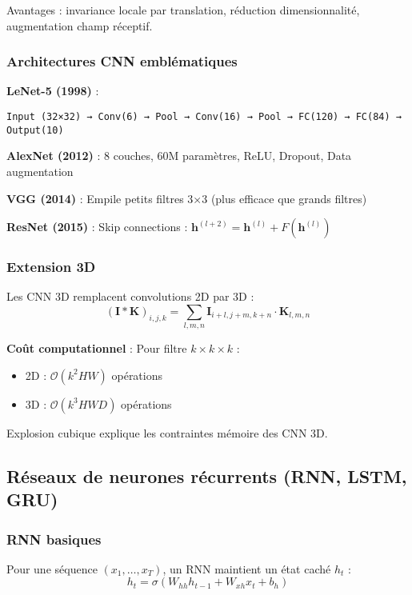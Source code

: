 Avantages : invariance locale par translation, réduction dimensionnalité, augmentation champ réceptif.

\subsubsection{Architectures CNN emblématiques}

\textbf{LeNet-5 (1998)} :
\begin{verbatim}
Input (32×32) → Conv(6) → Pool → Conv(16) → Pool → FC(120) → FC(84) → Output(10)
\end{verbatim}

\textbf{AlexNet (2012)} :
8 couches, 60M paramètres, ReLU, Dropout, Data augmentation

\textbf{VGG (2014)} :
Empile petits filtres 3×3 (plus efficace que grands filtres)

\textbf{ResNet (2015)} :
Skip connections : $\mathbf{h}^{(l+2)} = \mathbf{h}^{(l)} + F(\mathbf{h}^{(l)})$

\subsubsection{Extension 3D}

Les CNN 3D remplacent convolutions 2D par 3D :
\[
(\mathbf{I} * \mathbf{K})_{i,j,k} = \sum_{l,m,n} \mathbf{I}_{i+l, j+m, k+n} \cdot \mathbf{K}_{l,m,n}
\]

\textbf{Coût computationnel} : Pour filtre $k \times k \times k$ :
\begin{itemize}
    \item 2D : $\mathcal{O}(k^2 HW)$ opérations
    \item 3D : $\mathcal{O}(k^3 HWD)$ opérations
\end{itemize}

Explosion cubique explique les contraintes mémoire des CNN 3D.

\subsection{Réseaux de neurones récurrents (RNN, LSTM, GRU)}

\subsubsection{RNN basiques}

Pour une séquence $(x_1, \ldots, x_T)$, un RNN maintient un état caché $h_t$ :
\[
h_t = \sigma(W_{hh} h_{t-1} + W_{xh} x_t + b_h)
\]

